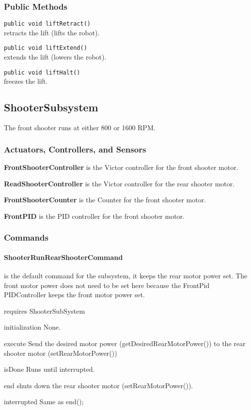 \documentclass[]{article}
\begin{document}
\subsubsection{Public Methods}

\noindent
\lstinline[]|public void liftRetract()| \\
retracts the lift (lifts the robot).

\noindent
\lstinline[]|public void liftExtend()| \\
extends the lift (lowers the robot).

\noindent
\lstinline[]|public void liftHalt()| \\
freezes the lift.


\subsection{ShooterSubsystem}

The front shooter runs at either 800 or 1600 RPM.

\subsubsection{Actuators, Controllers, and Sensors}

\textbf{FrontShooterController} is the Victor controller for the front shooter motor.

\textbf{ReadShooterController} is the Victor controller for the rear shooter motor.

\textbf{FrontShooterCounter} is the Counter for the front shooter motor.

\textbf{FrontPID} is the PID controller for the front shooter motor.

\subsubsection{Commands}

\paragraph{ShooterRunRearShooterCommand} is the default command for the subsystem, it keeps the rear motor power set. The front motor power does not need to be set here because the FrontPid PIDController keeps the front motor power set.
\begin{description}[topsep=0ex]
\item[requires] ShooterSubSystem
\item[initialization]  None.
\item[execute] Send the desired motor power (getDesiredRearMotorPower()) to the rear shooter motor (setRearMotorPower())
\item[isDone] Runs until interrupted.
\item[end] shuts down the rear shooter motor (setRearMotorPower()).
\item[interrupted] Same as end();
\end{description}
\end{document}
